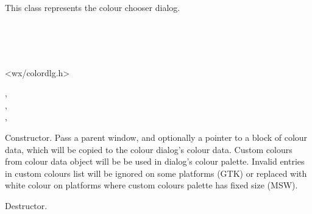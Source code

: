 \section{}\label{wxcolourdialog}

This class represents the colour chooser dialog.


\\
\\
\\


<wx/colordlg.h>




,\\
,\\
,\\


\label{wxcolourdialogctor}


Constructor. Pass a parent window, and optionally a pointer to a block of colour
data, which will be copied to the colour dialog's colour data. Custom
colours from colour data object will be be used in dialog's colour palette.
Invalid entries in custom colours list will be ignored on some platforms (GTK)
or replaced with white colour on platforms where custom colours palette has
fixed size (MSW).



\label{wxcolourdialogdtor}


Destructor.

\label{wxcolourdialogcreate}

